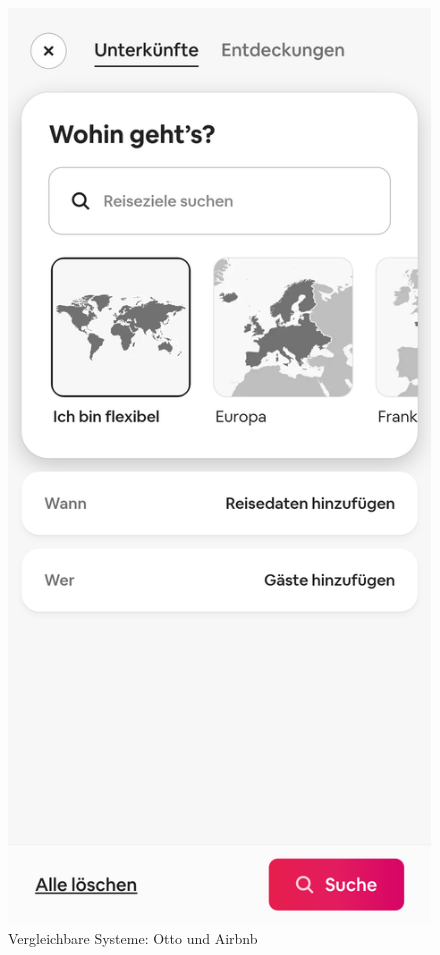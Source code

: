 \begin{figure}[h]
        \includegraphics[scale=0.12]{Bilder/Arbnbnsuche.png}
        \caption{Vergleichbare Systeme: Otto und Airbnb}\label{fig:system}
\end{figure}
